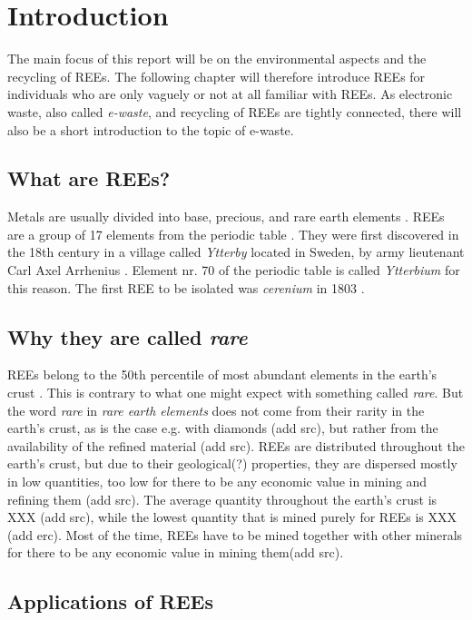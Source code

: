 
\section{Introduction}
The main focus of this report will be on the environmental aspects and the recycling of REEs. The following chapter will therefore introduce REEs for individuals who are only vaguely or not at all familiar with REEs. As electronic waste, also called \textit{e-waste}, and recycling of REEs are tightly connected, there will also be a short introduction to the topic of e-waste. 

\subsection{What are REEs?}

Metals are usually divided into base, precious, and rare earth elements \cite{javed2024}. REEs are a group of 17 elements from the periodic table \cite{USDoE2024}. They were first discovered in the 18th century in a village called \textit{Ytterby} located in Sweden, by army lieutenant Carl Axel Arrhenius \cite{britannica2024}. Element nr. 70 of the periodic table is called \textit{Ytterbium} for this reason. The first REE to be isolated was \textit{cerenium} in 1803 \cite{britannica2024}.  

\subsection{Why they are called \textit{rare}}

REEs belong to the 50th percentile of most abundant elements in the earth's crust \cite{britannica2024}. This is contrary to what one might expect with something called \textit{rare}. But the word \textit{rare} in \textit{rare earth elements} does not come from their rarity in the earth's crust, as is the case e.g. with diamonds (add src), but rather from the availability of the refined material (add src).  REEs are distributed throughout the earth's crust, but due to their geological(?) properties, they are dispersed mostly in low quantities, too low for there to be any economic value in mining and refining them (add src). The average quantity throughout the earth's crust is XXX (add src), while the lowest quantity that is mined purely for REEs is XXX (add erc). Most of the time, REEs have to be mined together with other minerals for there to be any economic value in mining them(add src). 

\subsection{Applications of REEs}

